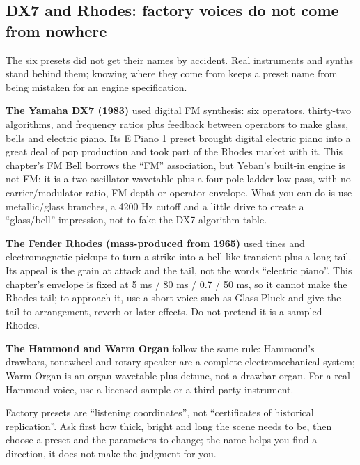 
\subsection{DX7 and Rhodes: factory voices do not come from nowhere}

The six presets did not get their names by accident. Real instruments and synths stand behind them; knowing where they come from keeps a preset name from being mistaken for an engine specification.

\textbf{The Yamaha DX7 (1983)} used digital FM synthesis: six operators, thirty-two algorithms, and frequency ratios plus feedback between operators to make glass, bells and electric piano. Its E Piano 1 preset brought digital electric piano into a great deal of pop production and took part of the Rhodes market with it. This chapter's FM Bell borrows the ``FM'' association, but Yeban's built-in engine is not FM: it is a two-oscillator wavetable plus a four-pole ladder low-pass, with no carrier/modulator ratio, FM depth or operator envelope. What you can do is use metallic/glass branches, a 4200 Hz cutoff and a little drive to create a ``glass/bell'' impression, not to fake the DX7 algorithm table.

\textbf{The Fender Rhodes (mass-produced from 1965)} used tines and electromagnetic pickups to turn a strike into a bell-like transient plus a long tail. Its appeal is the grain at attack and the tail, not the words ``electric piano''. This chapter's envelope is fixed at 5 ms / 80 ms / 0.7 / 50 ms, so it cannot make the Rhodes tail; to approach it, use a short voice such as Glass Pluck and give the tail to arrangement, reverb or later effects. Do not pretend it is a sampled Rhodes.

\textbf{The Hammond and Warm Organ} follow the same rule: Hammond's drawbars, tonewheel and rotary speaker are a complete electromechanical system; Warm Organ is an organ wavetable plus detune, not a drawbar organ. For a real Hammond voice, use a licensed sample or a third-party instrument.

Factory presets are ``listening coordinates'', not ``certificates of historical replication''. Ask first how thick, bright and long the scene needs to be, then choose a preset and the parameters to change; the name helps you find a direction, it does not make the judgment for you.

